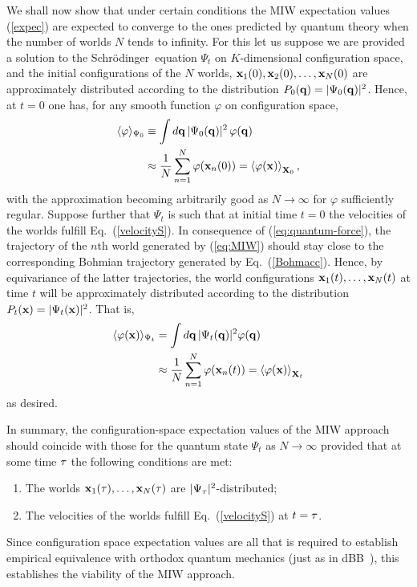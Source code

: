 \documentclass[twocolumn,aps,pra,amsmath,amssymb,superscriptaddress]{revtex4}
\newcommand{\nn}{\nonumber}
\newcommand{\sch}{Schr\"odinger}
\newcommand{\an}[1]{\left\langle{#1}\right\rangle}
\renewcommand{\(}{\left(}
\renewcommand{\)}{\right)}
\newcommand{\blk}{\color{black}}
\begin{document}
We shall now show that under certain conditions the MIW expectation
values (\ref{expec}) are expected to converge to the ones predicted by quantum theory 
when the number of worlds $N$ tends to infinity.
For this let us suppose we are provided a solution to the
\sch\ equation $\Psi_t$ on $K$-dimensional configuration space, 
and the initial configurations of the
$N$ worlds, ${\bf x}_1(0),{\bf x}_2(0),\dots,{\bf x}_N(0)$ are approximately
distributed according to the distribution $P_0({\bf q})=|\Psi_0({\bf
q})|^2$.  
Hence, at $t=0$ one has, for any smooth function $\varphi$ on configuration space, \blk 
\begin{align*} 
\langle {\varphi}\blk \rangle_{\Psi_0} &\equiv \int d{\bf q}\,|\Psi_0({\bf q})|^2 \, {\varphi}({\bf q}) \blk \\
 &\approx \frac{1}{N}\sum_{n=1}^N {\varphi}({\bf x}_n(0)) = \an{\varphi({\bf x})}_{{\bf X}_{0}}, \blk
\end{align*}
with the approximation becoming arbitrarily good as
$N\to\infty$ for $\varphi$ sufficiently regular. \blk 
Suppose further that $\Psi_t$ is such that  at initial time $t=0$ the
velocities of the worlds fulfill   Eq.~(\ref{velocityS})\blk.
In consequence of (\ref{eq:quantum-force}),  \blk the trajectory of
the $n$th world generated by (\ref{eq:MIW}) should stay close to the
corresponding Bohmian trajectory generated by   Eq.~(\ref{Bohmacc})\blk. Hence, by
equivariance of the latter trajectories, the world configurations ${\bf
x}_1(t),\dots,{\bf x}_N(t)$ at time $t$ will be approximately distributed
according to the distribution $P_t({\bf x})=|\Psi_t({\bf x})|^2$. That is, \blk
\begin{align} \nn
\langle {\varphi}({\bf x})\rangle_{\Psi_t} &= \int d{\bf q}\,|\Psi_t({\bf q})|^2 {\varphi}({\bf q}) \blk \\ 
\label{timeav}
&\approx \frac{1}{N}\sum_{n=1}^N {\varphi}({\bf x}_n(t)) = \an{\varphi({\bf x})}_{{\bf X}_t} 
\end{align} \blk
as desired. 

In summary, the configuration-space \blk expectation values of the MIW approach should \blk coincide with 
those for the quantum state $\Psi_t$ as
$N\to\infty$ provided that \blk at some time 
$\tau\blk$ the following conditions are
met:
\begin{enumerate}
    \item The worlds ${\bf x}_1(\tau\blk),\ldots,{\bf x}_N(\tau\blk)$ are
        $|\Psi_{\tau\blk}|^2$-distributed;
    \item The velocities of the worlds fulfill Eq.~(\ref{velocityS}) at $t=\tau\blk$.
\end{enumerate}
Since configuration space expectation values are all that is required to establish empirical 
equivalence with orthodox quantum mechanics (just as in dBB~\cite{dbb}), this 
establishes the viability of the MIW approach.  
		
\end{document}
